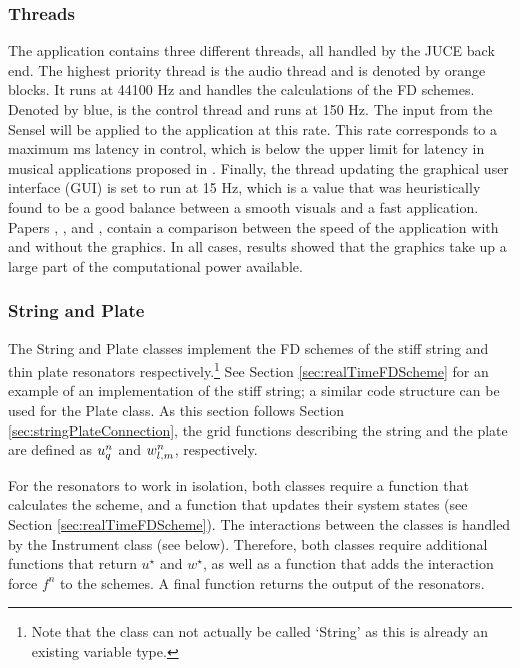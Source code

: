 \subsubsection{Threads}
The application contains three different threads, all handled by the JUCE back end. The highest priority thread is the audio thread and is denoted by orange blocks. It runs at 44100 Hz and handles the calculations of the FD schemes. Denoted by blue, is the control thread and runs at 150 Hz. The input from the Sensel will be applied to the application at this rate. This rate corresponds to a maximum  ms latency in control, which is below the upper limit for latency in musical applications proposed in \cite{Wessel2002}. Finally, the thread updating the graphical user interface (GUI) is set to run at 15 Hz, which is a value that was heuristically found to be a good balance between a smooth visuals and a fast application. %
Papers \citeP[A], \citeP[C], and \citeP[H], contain a comparison between the speed of the application with and without the graphics. In all cases, results showed that the graphics take up a large part of the computational power available.

\subsubsection{String and Plate}
The String and Plate classes implement the FD schemes of the stiff string and thin plate resonators respectively.\footnote{Note that the class can not actually be called `String' as this is already an existing variable type.} See Section \ref{sec:realTimeFDScheme} for an example of an implementation of the stiff string; a similar code structure can be used for the Plate class. As this section follows Section \ref{sec:stringPlateConnection}, the grid functions describing the string and the plate are defined as $u_q^n$ and $w_{l,m}^n$, respectively. 

For the resonators to work in isolation, both classes require a function that calculates the scheme, and a function that updates their system states (see Section \ref{sec:realTimeFDScheme}). The interactions between the classes is handled by the Instrument class (see below). Therefore, both classes require additional functions that return $u^\star$ and $w^\star$, as well as a function that adds the interaction force $f^n$ to the schemes. A final function returns the output of the resonators.

